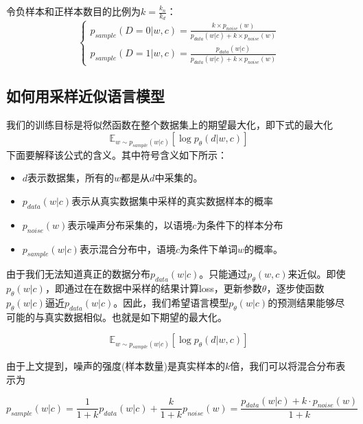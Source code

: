 \documentclass{article}
\begin{document}
令负样本和正样本数目的比例为$k=\frac{k_n}{k_d}$：
\begin{equation}
    \begin{cases}
        p_{sample}(D=0|w,c)=\frac{k \times p_{noise}(w)}{p_{data}(w|c) + k \times p_{noise}(w)}\\
        p_{sample}(D=1|w,c)=\frac{p_{data}(w|c)}{p_{data}(w|c) + k \times p_{noise}(w)}
    \end{cases}
    \label{EQ:NCE_Simplification}
\end{equation}

\subsection{如何用采样近似语言模型}

我们的训练目标是将似然函数在整个数据集上的期望最大化，即下式的最大化
\begin{equation}
    \mathbb{E}_{w \sim p_{sample}(w|c)} \left[\log p_\theta(d|w,c) \right]
\end{equation}
下面要解释该公式的含义。其中符号含义如下所示：
\begin{itemize}
    \item $d$表示数据集，所有的$w$都是从$d$中采集的。
    \item $p_{data}(w|c)$表示从真实数据集中采样的真实数据样本的概率
    \item $p_{noise}(w)$表示噪声分布采集的，以语境$c$为条件下的样本分布
    \item $p_{sample}(w|c)$表示混合分布中，语境$c$为条件下单词$w$的概率。
\end{itemize}
由于我们无法知道真正的数据分布$p_{data}(w|c)$。只能通过$p_{\theta}(w,c)$来近似。即使$p_{\theta}(w|c)$，即通过在在数据中采样的结果计算loss，更新参数$\theta$，逐步使函数$p_{\theta}(w|c)$逼近$p_{data}(w|c)$。因此，我们希望语言模型$p_{\theta}(w|c)$的预测结果能够尽可能的与真实数据相似。也就是如下期望的最大化。

\begin{equation}
    \mathbb{E}_{w \sim p_{sample}(w|c)} \left[\log p_\theta(d|w,c) \right]
\end{equation}

由于上文提到，噪声的强度(样本数量)是真实样本的$k$倍，我们可以将混合分布表示为

\begin{equation}
    p_{sample}(w|c) = \frac{1}{1+k}p_{data}(w|c) + \frac{k}{1+k} p_{noise}(w) = \frac{p_{data}(w|c)+ k \cdot p_{noise}(w)}{1+k}
\end{equation}
\end{document}
